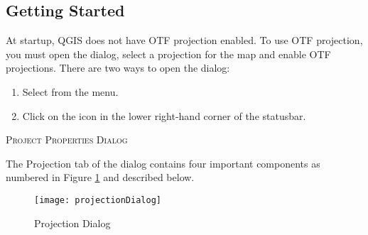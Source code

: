 
\subsection{Getting Started}\label{label_projstart}

At startup, QGIS does not have OTF projection enabled. To use OTF
projection, you must open the  dialog, select a
projection for the map and enable OTF projections. There are two ways to open
the  dialog:

\begin{enumerate}
\item Select  from the  menu.
\item Click on the  icon in the lower right-hand corner of the
statusbar.
\end{enumerate}

\begin{Tip}
 \caption{\textsc{Project Properties Dialog}}
\end{Tip}

The Projection tab of the  dialog contains four important components as numbered in Figure
\ref{fig:projections} and described below.

\begin{figure}[ht]
   \begin{center}
   \caption{Projection Dialog}\label{fig:projections}\smallskip
   \texttt{[image: projectionDialog]}
\end{center}  
\end{figure}

